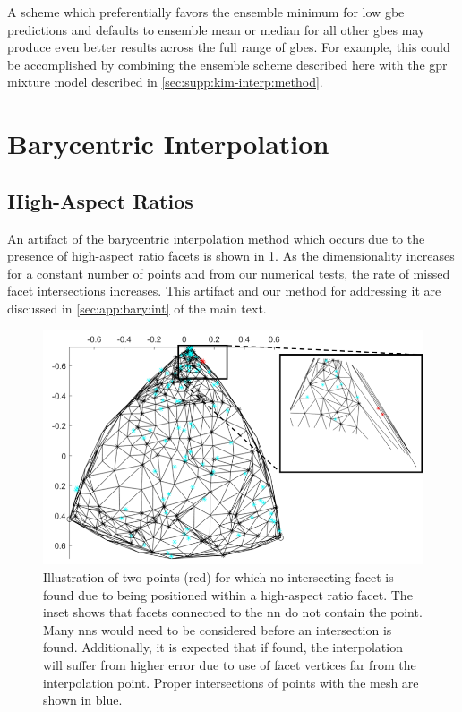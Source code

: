 \documentclass[preprint,12pt]{elsarticle}
\begin{document}
	A scheme which preferentially favors the ensemble minimum for low \gls{gbe} predictions and defaults to ensemble mean or median for all other \glspl{gbe} may produce even better results across the full range of \glspl{gbe}. For example, this could be accomplished by combining the ensemble scheme described here with the \gls{gpr} mixture model described in \cref{sec:supp:kim-interp:method}.
	
	\section{Barycentric Interpolation}
	\label{sec:supp:bary}
	
	\subsection{High-Aspect Ratios}
	\label{sec:supp:bary:artifact}
	An artifact of the barycentric interpolation method which occurs due to the presence of high-aspect ratio facets is shown in \cref{fig:high-aspect-non-int}. As the dimensionality increases for a constant number of points and from our numerical tests, the rate of missed facet intersections increases. This artifact and our method for addressing it are discussed in \cref{sec:app:bary:int} of the main text.
	
	\begin{figure}
		\centering
		\includegraphics[scale=1]{figures/high-aspect-non-int.png}
		\caption{Illustration of two \outpt{} points (red) for which no intersecting facet is found due to being positioned within a high-aspect ratio facet. The inset shows that facets connected to the \gls{nn} do not contain the \outpt{} point. Many \glspl{nn} would need to be considered before an intersection is found. Additionally, it is expected that if found, the interpolation will suffer from higher error due to use of facet vertices far from the interpolation point. Proper intersections of \outpt{} points with the mesh are shown in blue.}
		\label{fig:high-aspect-non-int}
	\end{figure}
	
\end{document}
